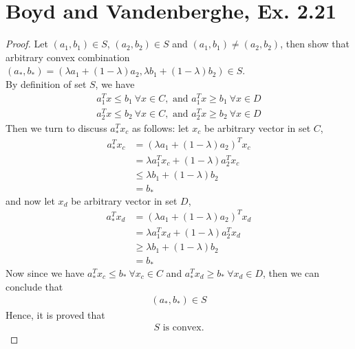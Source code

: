 \documentclass[11pt,a4paper]{article}
\begin{document}
\section{Boyd and Vandenberghe, Ex. 2.21}
\begin{proof}
    Let $(a_1, b_1) \in S$, $(a_2, b_2) \in S$ and $(a_1, b_1) \not = (a_2, b_2)$, then
    show that arbitrary convex combination $(a_{*}, b_{*}) = (\lambda a_1 +
    (1-\lambda) a_2, \lambda b_1 + (1-\lambda) b_2) \in S$. \\
    By definition of set $S$, we have
    \begin{align}
        a_1^T x \leq b_1\ \forall x \in C, \text{ and } a_1^T x \geq b_1\ \forall x \in D \\
        a_2^T x \leq b_2\ \forall x \in C, \text{ and } a_2^T x \geq b_2\ \forall x \in D 
    \end{align}
    Then we turn to discuss $a_{*}^T x_c$ as follows: let $x_c$ be arbitrary
    vector in set $C$, 
    \begin{align}
        a_{*}^T x_c &= (\lambda a_1 + (1-\lambda) a_2)^T x_c \\
        &= \lambda a_1^T x_c + (1-\lambda) a_2^Tx_c \\
        &\leq \lambda b_1 + (1-\lambda) b_2 \\
        &= b_{*}
    \end{align}
    and now let $x_d$ be arbitrary vector in set $D$,
    \begin{align}
        a_{*}^T x_d &= (\lambda a_1 + (1-\lambda) a_2)^T x_d \\
        &= \lambda a_1^T x_d + (1-\lambda) a_2^Tx_d \\
        &\geq \lambda b_1 + (1-\lambda) b_2 \\
        &= b_{*}
    \end{align}
    Now since we have $a_{*}^T x_c \leq b_{*}\ \forall x_c \in C$ and 
    $a_{*}^T x_d \geq b_{*}\ \forall x_d \in D$, then we can conclude that 
    \begin{align}
        (a_{*}, b_{*}) \in S
    \end{align}
    Hence, it is proved that 
    \begin{align}
        S \text{ is convex.}
    \end{align}
\end{proof}

\setcounter{section}{6}
\end{document}
